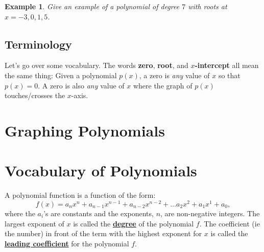 \documentclass[twoside]{tufte-handout}
\newcommand{\booksection}{0}
\newcommand{\pageheader}{}
\newcounter{ekcounter}%
\theoremstyle{ekimcustom}
\newtheorem{exm}[ekcounter]{Example}
\begin{document}
\begin{exm}{Give an example of a polynomial of degree $7$ with roots at $x=-3, 0, 1, 5$. }
\end{exm}\vskip10pt




\subsection{Terminology}
Let's go over some vocabulary. The words {\bf zero}, {\bf root}, and {\bf $x$-intercept} all mean the same thing: Given a polynomial $p(x)$, a zero is {\it any} value of $x$ so that $p(x)=0$. A zero is also  {\it any} value of $x$ where the graph of $p(x)$ touches/crosses the $x$-axis.




\renewcommand{\booksection}{ Graphing Polynomials  }
\renewcommand{\pageheader}{\booksection }
\resetcounters

\section*{\LARGE \pageheader}

\begin{intro}
\begin{abstract}
\end{abstract}
\end{intro}
%
%



\section{Vocabulary of Polynomials}
 A polynomial function is a function of the form: $$f(x)=a_nx^n+a_{n-1}x^{n-1}+a_{n-2}x^{n-2}+\dots a_2x^2+a_1x^1+a_0,$$ where the $a_i$'s are constants and the exponents, $n$, are non-negative integers.  The largest exponent of $x$ is called the \underline{\bf degree} of the polynomial $f$. The coefficient (ie the number) in front of the term with the highest exponent for $x$ is called the  \underline{\bf leading coefficient} for the polynomial $f$. 
\end{document}
